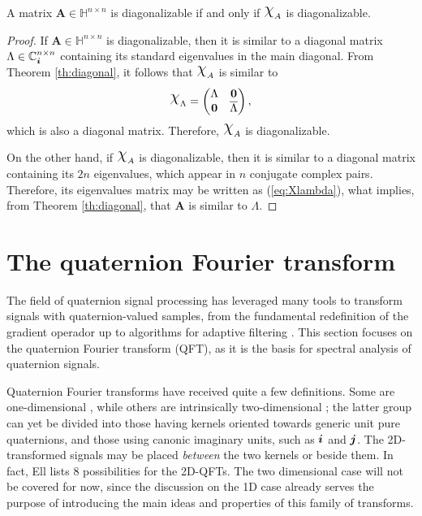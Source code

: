 \begin{corollary}
    \label{cor:diagonalizable}
    A matrix $  \mathbf{A} \in \mathbb{H}^{n \times n} $ is diagonalizable if and only if $ \rchi_A $ is diagonalizable.
\end{corollary}
\begin{proof}
    If $ \mathbf{A} \in \mathbb{H}^{n \times n} $ is diagonalizable, then it is similar to a diagonal matrix $ \Lambda \in \mathbb{C}^{n \times n}_{\boldsymbol{i}} $ containing its standard eigenvalues in the main diagonal. From Theorem \ref{th:diagonal}, it follows that $ \rchi_A $ is similar to
    \begin{equation}
        \label{eq:Xlambda}
        \rchi_{\Lambda} =
        \begin{pmatrix}
            \Lambda    & \mathbf{0}         \\
            \mathbf{0} & \overline{\Lambda}
        \end{pmatrix},
    \end{equation}
    which is also a diagonal matrix. Therefore, $ \rchi_A $ is diagonalizable.

    On the other hand, if $ \rchi_A $ is diagonalizable, then it is similar to a diagonal matrix containing its $ 2n $ eigenvalues, which appear in $ n $ conjugate complex pairs. Therefore, its eigenvalues matrix may be written as (\ref{eq:Xlambda}), what implies, from Theorem \ref{th:diagonal}, that $ \mathbf{A} $ is similar to $ \Lambda $.
\end{proof}

\section{The quaternion Fourier transform}
\label{sec:QFT}
The field of quaternion signal processing has leveraged many tools to transform signals with quaternion-valued samples, from the fundamental redefinition of the gradient operador \cite{jiang2014general} up to algorithms for adaptive filtering \cite{jiang2013frequency}. This section focuses on the quaternion Fourier transform (QFT), as it is the basis for spectral analysis of quaternion signals.

Quaternion Fourier transforms have received quite a few definitions. Some are one-dimensional \cite{flamant2017spectral}, while others are intrinsically two-dimensional \cite{guanlei2008fractional}; the latter group can yet be divided into those having kernels oriented towards generic unit pure quaternions, and those using canonic imaginary units, such as $ \boldsymbol{i} $ and $ \boldsymbol{j} $. The 2D-transformed signals may be placed \textit{between} the two kernels or beside them. In fact, Ell \cite[sec. 3.2]{ell2014quaternion} lists 8 possibilities for the 2D-QFTs. The two dimensional case will not be covered for now, since the discussion on the 1D case already serves the purpose of introducing the main ideas and properties of this family of transforms.

